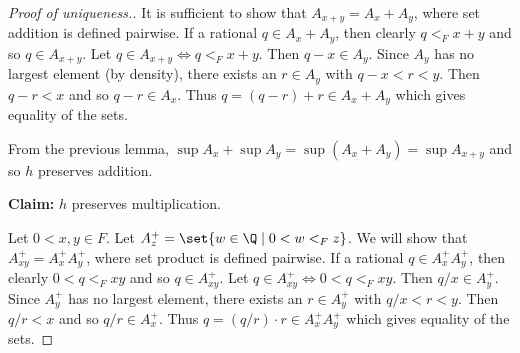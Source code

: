 \begin{proof}[Proof of uniqueness.]
    \hfill\begin{minipage}{0.9\textwidth}
        It is sufficient to show that $A_{x+y} = A_x + A_y$, where set
        addition is defined pairwise.
        If a rational $q \in A_x + A_y$, then clearly $q <_F x + y$ and
        so $q \in A_{x+y}$.
        Let $q \in A_{x+y} \iff q <_F x + y$.
        Then $q - x \in A_y$.
        Since $A_y$ has no largest element (by density), there exists an
        $r \in A_y$ with $q - x < r < y$.
        Then $q - r < x$ and so $q - r \in A_x$.
        Thus $q = (q - r) + r \in A_x + A_y$ which gives equality of
        the sets.

        From the previous lemma, $\sup A_x + \sup A_y =
        \sup (A_x + A_y) = \sup A_{x+y}$ and so $h$ preserves addition.
    \end{minipage}

    \textbf{Claim:} $h$ preserves multiplication.

    \hfill\begin{minipage}{0.9\textwidth}
        Let $0 < x, y \in F$.
        Let $A^+_z = \set{w \in \Q \mid 0 < w <_F z}$.
        We will show that $A^+_{xy} = A^+_x A^+_y$, where set product is
        defined pairwise.
        If a rational $q \in A^+_x A^+_y$, then clearly $0 < q <_F xy$
        and so $q \in A^+_{xy}$.
        Let $q \in A^+_{xy} \iff 0 < q <_F xy$.
        Then $q/x \in A^+_y$.
        Since $A^+_y$ has no largest element, there exists an
        $r \in A^+_y$ with $q/x < r < y$.
        Then $q/r < x$ and so $q/r \in A^+_x$.
        Thus $q = (q/r) \cdot r \in A^+_x A^+_y$ which gives equality of
        the sets.


\end{minipage}
\end{proof}
